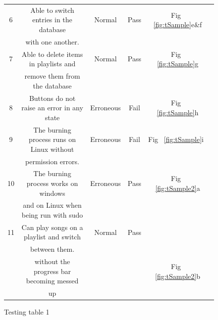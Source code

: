 \documentclass{article}
\begin{document}
\begin{figure}[H]
\begin{center}
\begin{tabular} { | c | c | c | c | c | c |}
            6               &Able to switch entries in the database    &      Normal            &       Pass       &Fig ~\ref{fig:tSample}e\&f\\
                            &with one another.                         &                        &                  &                         \\ \hline
            7               &Able to delete items in playlists and     &      Normal            &       Pass       & Fig ~\ref{fig:tSample}g \\
                            &remove them from the database             &                        &                  &                         \\ \hline
            8               &Buttons do not raise an error in any state&      Erroneous\cite{e1}&       Fail       & Fig ~\ref{fig:tSample}h \\ \hline
            9               &The burning process runs on Linux without &      Erroneous\cite{e2}&       Fail       & Fig ~\ref{fig:tSample}i \\
                            &permission errors.                        &                        &                  &                         \\ \hline
            10              &The burning process works on windows      &      Erroneous         &       Pass       & Fig ~\ref{fig:tSample2}a\\
                            &and on Linux when being run with sudo     &                        &                  &                         \\ \hline
            11              &Can play songs on a playlist and switch   &      Normal            &       Pass       &                         \\
                            &between them.                             &                        &                  &                         \\ \hline
                            &without the progress bar becoming messed &                        &                  & Fig ~\ref{fig:tSample2}b \\
                            &up                                        &                        &                  &                         \\ \hline
        \end{tabular}
    \end{center}
    \caption{Testing table 1} \label{fig:testTable1}
\end{figure}
\end{document}
